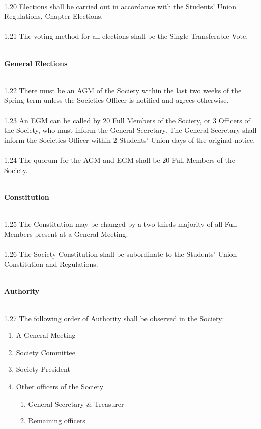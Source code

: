 \documentclass[a4paper,twoside,notitlepage,11pt]{article}
\newcommand{\consHead}[1]{\begin{Large}\textbf{#1}\end{Large}\ \\}
\begin{document}
\ \\
1.20 Elections shall be carried out in accordance with the Students' Union Regulations, Chapter Elections.\ \\
\ \\
1.21 The voting method for all elections shall be the Single Transferable Vote.\ \\
\ \\
\consHead{General Elections}
1.22 There must be an AGM of the Society within the last two weeks of the Spring term unless the Societies Officer is notified and agrees otherwise.\ \\
\ \\
1.23 An EGM can be called by 20 Full Members of the Society, or 3 Officers of the Society, who must inform the General Secretary. The General Secretary shall inform the Societies Officer within 2 Students' Union days of the original notice.\ \\
\ \\
1.24 The quorum for the AGM and EGM shall be 20 Full Members of the Society. 
\ \\
\ \\
\consHead{Constitution}
1.25	The Constitution may be changed by a two-thirds majority of all Full Members present at a General Meeting.\ \\
\ \\
1.26 The Society Constitution shall be subordinate to the Students' Union Constitution and Regulations.
\ \\
\ \\
\consHead{Authority}
1.27 The following order of Authority shall be observed in the Society:
\begin{enumerate}
	\item A General Meeting
	\item Society Committee
	\item Society President
	\item Other officers of the Society
	\begin{enumerate}
		\item General Secretary \& Treasurer
		\item Remaining officers
	\end{enumerate}
\end{enumerate}
\end{document}
